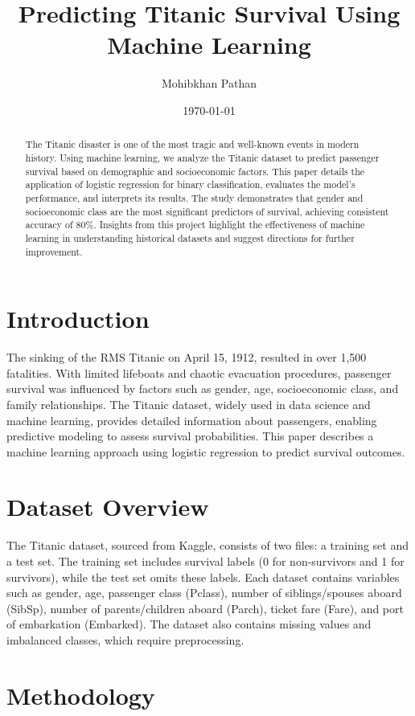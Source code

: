 \documentclass[12pt]{article}
\title{Predicting Titanic Survival Using Machine Learning}
\author{Mohibkhan Pathan}
\date{\today}
\begin{document}
\maketitle

\begin{abstract}
The Titanic disaster is one of the most tragic and well-known events in modern history. Using machine learning, we analyze the Titanic dataset to predict passenger survival based on demographic and socioeconomic factors. This paper details the application of logistic regression for binary classification, evaluates the model's performance, and interprets its results. The study demonstrates that gender and socioeconomic class are the most significant predictors of survival, achieving consistent accuracy of 80\%. Insights from this project highlight the effectiveness of machine learning in understanding historical datasets and suggest directions for further improvement.
\end{abstract}

\section{Introduction}
The sinking of the RMS Titanic on April 15, 1912, resulted in over 1,500 fatalities. With limited lifeboats and chaotic evacuation procedures, passenger survival was influenced by factors such as gender, age, socioeconomic class, and family relationships. The Titanic dataset, widely used in data science and machine learning, provides detailed information about passengers, enabling predictive modeling to assess survival probabilities. This paper describes a machine learning approach using logistic regression to predict survival outcomes.

\section{Dataset Overview}
The Titanic dataset, sourced from Kaggle, consists of two files: a training set and a test set. The training set includes survival labels (0 for non-survivors and 1 for survivors), while the test set omits these labels. Each dataset contains variables such as gender, age, passenger class (Pclass), number of siblings/spouses aboard (SibSp), number of parents/children aboard (Parch), ticket fare (Fare), and port of embarkation (Embarked). The dataset also contains missing values and imbalanced classes, which require preprocessing.

\section{Methodology}
\end{document}
